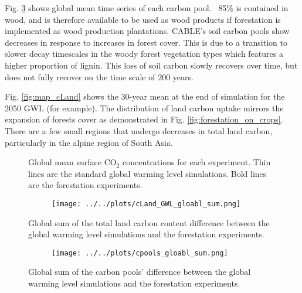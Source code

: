 \documentclass[]{article}
\begin{document}
Fig. \ref{fig:global_cpools} shows global mean time series of each carbon pool.
~85\% is contained in wood, and is therefore available to be used as wood products if forestation is implemented as wood production plantations.
CABLE's soil carbon pools show decreases in response to increases in forest cover.
This is due to a transition to slower decay timescales in the woody forest vegetation types which features a higher proportion of lignin.
This loss of soil carbon slowly recovers over time, but does not fully recover on the time scale of 200 years. 

Fig. \ref{fig:map_cLand} shows the 30-year mean at the end of simulation for the 2050 GWL (for example).
The distribution of land carbon uptake mirrors the expansion of forests cover as demonstrated in Fig. \ref{fig:forestation_on_crops}.
There are a few small regions that undergo decreases in total land carbon, particularly in the alpine region of South Asia.

\begin{figure}[H]
    \centering
    \begin{subfigure}[b]{\linewidth}
        
    \end{subfigure}
    \caption{Global mean surface CO$_2$ concentrations for each experiment. Thin lines are the standard global warming level simulations. Bold lines are the forestation experiments.}
    \label{fig:global_co2}
\end{figure}

\begin{figure}[H]
    \centering
    \begin{subfigure}[b]{\linewidth}
        \texttt{[image: ../../plots/cLand\_GWL\_gloabl\_sum.png]}
    \end{subfigure}
    \caption{Global sum of the total land carbon content difference between the global warming level simulations and the forestation experiments.}
    \label{fig:global_cLand}
\end{figure}

\begin{figure}[H]
    \centering
    \begin{subfigure}[b]{\linewidth}
        \texttt{[image: ../../plots/cpools\_gloabl\_sum.png]}
    \end{subfigure}
    \caption{Global sum of the carbon pools' difference between the global warming level simulations and the forestation experiments.}
    \label{fig:global_cpools}
\end{figure}
\end{document}
